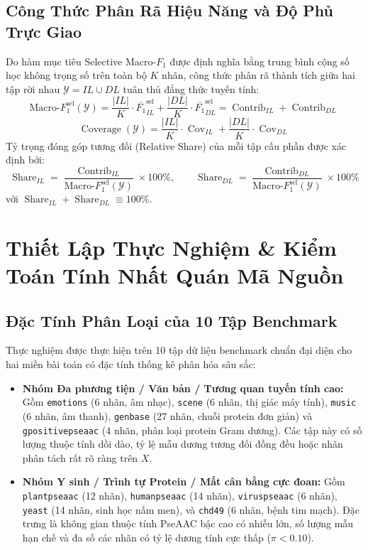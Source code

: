 \documentclass[10pt,a4paper]{article}
\begin{document}
\subsection{Công Thức Phân Rã Hiệu Năng và Độ Phủ Trực Giao}
Do hàm mục tiêu Selective Macro-$F_1$ được định nghĩa bằng trung bình cộng số học không trọng số trên toàn bộ $K$ nhãn, công thức phân rã thành tích giữa hai tập rời nhau $\mathcal{Y} = IL \cup DL$ tuân thủ đẳng thức tuyến tính:
\begin{equation}
    \text{Macro-}F_1^{\text{sel}}(\mathcal{Y}) = \frac{|IL|}{K} \cdot \overline{F_1}^{\text{sel}}_{IL} + \frac{|DL|}{K} \cdot \overline{F_1}^{\text{sel}}_{DL} = \operatorname{Contrib}_{IL} + \operatorname{Contrib}_{DL}
\end{equation}
\begin{equation}
    \operatorname{Coverage}(\mathcal{Y}) = \frac{|IL|}{K} \cdot \operatorname{Cov}_{IL} + \frac{|DL|}{K} \cdot \operatorname{Cov}_{DL}
\end{equation}
Tỷ trọng đóng góp tương đối (Relative Share) của mỗi tập cấu phần được xác định bởi:
\begin{equation}
    \operatorname{Share}_{IL} = \frac{\operatorname{Contrib}_{IL}}{\text{Macro-}F_1^{\text{sel}}(\mathcal{Y})} \times 100\%, \qquad \operatorname{Share}_{DL} = \frac{\operatorname{Contrib}_{DL}}{\text{Macro-}F_1^{\text{sel}}(\mathcal{Y})} \times 100\%
\end{equation}
với $\operatorname{Share}_{IL} + \operatorname{Share}_{DL} \equiv 100\%$.

\section{Thiết Lập Thực Nghiệm \& Kiểm Toán Tính Nhất Quán Mã Nguồn}

\subsection{Đặc Tính Phân Loại của 10 Tập Benchmark}
Thực nghiệm được thực hiện trên 10 tập dữ liệu benchmark chuẩn đại diện cho hai miền bài toán có đặc tính thống kê phân hóa sâu sắc:
\begin{itemize}[leftmargin=*]
    \item \textbf{Nhóm Đa phương tiện / Văn bản / Tương quan tuyến tính cao:} Gồm \texttt{emotions} (6 nhãn, âm nhạc), \texttt{scene} (6 nhãn, thị giác máy tính), \texttt{music} (6 nhãn, âm thanh), \texttt{genbase} (27 nhãn, chuỗi protein đơn giản) và \texttt{gpositivepseaac} (4 nhãn, phân loại protein Gram dương). Các tập này có số lượng thuộc tính dồi dào, tỷ lệ mẫu dương tương đối đồng đều hoặc nhãn phân tách rất rõ ràng trên $X$.
    \item \textbf{Nhóm Y sinh / Trình tự Protein / Mất cân bằng cực đoan:} Gồm \texttt{plantpseaac} (12 nhãn), \texttt{humanpseaac} (14 nhãn), \texttt{viruspseaac} (6 nhãn), \texttt{yeast} (14 nhãn, sinh học nấm men), và \texttt{chd49} (6 nhãn, bệnh tim mạch). Đặc trưng là không gian thuộc tính PseAAC bậc cao có nhiễu lớn, số lượng mẫu hạn chế và đa số các nhãn có tỷ lệ dương tính cực thấp ($\pi < 0.10$).
\end{itemize}
\end{document}

